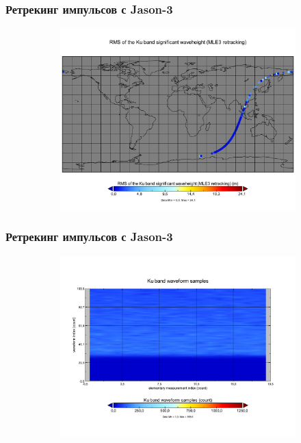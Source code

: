 \documentclass[10pt,pdf,hyperref={unicode}, dvipsnames]{beamer}
\begin{document}
\begin{frame}
\frametitle{Ретрекинг импульсов с Jason-3}
\vskip -3pt
\begin{figure}[ht]
    \centering
    \begin{subfigure}{\linewidth}
        \centering
        \includegraphics[width=\linewidth]{img/swh_rms_ku_mle3}
    \end{subfigure}
\end{figure}
\end{frame}
\begin{frame}
\frametitle{Ретрекинг импульсов с Jason-3}
\vskip -3pt
\begin{figure}[ht]
    \centering
    \begin{subfigure}{\linewidth}
        \centering
        \includegraphics[width=\linewidth]{img/waveforms_20hz_ku.pdf}
    \end{subfigure}
\end{figure}
\end{frame}
\end{document}
